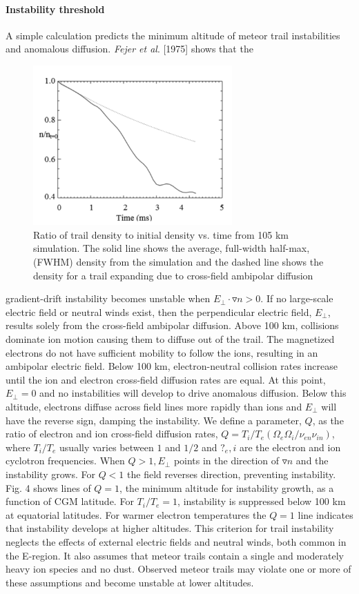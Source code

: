 \documentclass [a4paper,10pt,twocolumn]{article}
\begin{document}
\paragraph{Instability threshold} A simple calculation predicts the minimum altitude of meteor trail instabilities and anomalous diffusion. \textit{Fejer et al}. [1975] shows that the
\begin{figure}[h]
 \includegraphics[width=3in]{1.PNG}
 \footnotesize\caption{Ratio of trail density to initial density vs. time from 105 km simulation. The solid line shows the average, full-width half-max, (FWHM) density from the simulation and the dashed line shows the density for a trail expanding due to cross-field ambipolar diffusion}
\end{figure}
gradient-drift instability becomes unstable when $E_\perp \cdot\triangledown n > 0$. If no large-scale electric field or neutral winds exist, then the perpendicular electric field, $E_\perp$, results solely from the cross-field ambipolar diffusion. Above 100 km, collisions dominate ion motion causing them to diffuse out of the trail. The magnetized electrons do not have sufficient mobility to follow the ions, resulting in an ambipolar electric field. Below 100 km, electron-neutral collision rates increase until the ion and electron cross-field diffusion rates are equal. At this point, $E_\perp = 0$ and no instabilities will develop to drive anomalous diffusion. Below this altitude, electrons diffuse across field lines more rapidly than ions and $E_\perp$ will have the reverse sign, damping the instability. We define a parameter, $Q$, as the ratio of electron and ion cross-field diffusion rates, $Q = T_i/T_e(\Omega_e \Omega_i/\nu_{en} \nu_{in})$, where $T_i/T_e$ usually varies between $1$ and $1/2$ and $?_e,i$ are the electron and ion cyclotron frequencies. When $Q>1, E_\perp$ points in the direction of $\triangledown n$ and the instability grows. For $Q<1$ the field reverses direction, preventing instability. Fig. 4 shows lines of $Q = 1$, the minimum altitude for instability growth, as a function of CGM latitude. For $T_i/T_e = 1$, instability is suppressed below 100 km at equatorial latitudes. For warmer electron temperatures the $Q = 1$ line indicates that instability develops at higher altitudes. This criterion for trail instability neglects the effects of external electric fields and neutral winds, both common in the E-region. It also assumes that meteor trails contain a single and moderately heavy ion species and no dust. Observed meteor trails may violate one or more of these assumptions and become unstable at lower altitudes.
\end{document}
